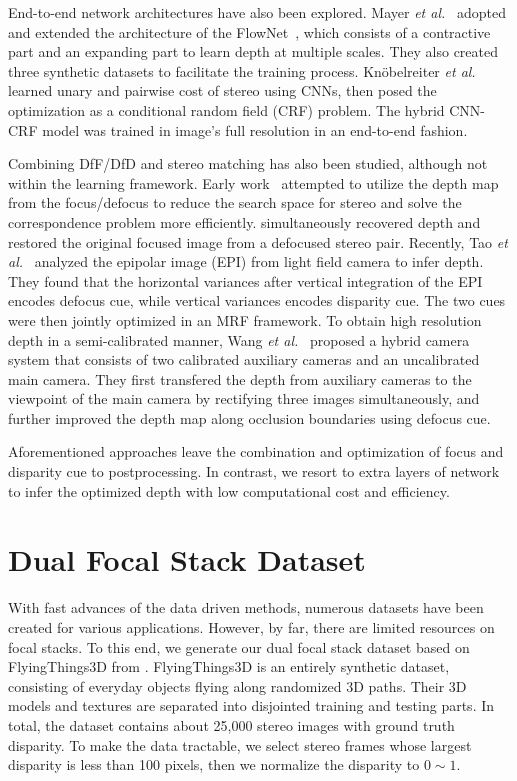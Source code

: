 \documentclass[10pt,twocolumn,letterpaper]{article}
\begin{document}
End-to-end network architectures have also been explored. Mayer \emph{et al.}~\cite{mayer16} adopted and extended the architecture of the FlowNet~\cite{dosovitskiy2015flownet}, which consists of a contractive part and an expanding part to learn depth at multiple scales. They also created three synthetic datasets to facilitate the training process. Kn{\"o}belreiter \emph{et al.}~\cite{knobelreiter2016end} learned unary and pairwise cost of stereo using CNNs, then posed the optimization as a conditional random field (CRF) problem. The hybrid CNN-CRF model was trained in image's full resolution in an end-to-end fashion.

Combining DfF/DfD and stereo matching has also been studied, although not within the learning framework. Early work~\cite{klarquist95, subbarao97} attempted to utilize the depth map from the focus/defocus to reduce the search space for stereo and solve the correspondence problem more efficiently. \cite{Rajagopalan04} simultaneously recovered depth and restored the original focused image from a defocused stereo pair. Recently, Tao \emph{et al.}~\cite{tao13} analyzed the epipolar image (EPI) from light field camera to infer depth. They found that the horizontal variances after vertical integration of the EPI encodes defocus cue, while vertical variances encodes disparity cue. The two cues were then jointly optimized in an MRF framework. To obtain high resolution depth in a semi-calibrated manner, Wang \emph{et al.}~\cite{wang16} proposed a hybrid camera system that consists of two calibrated auxiliary cameras and an uncalibrated main camera. They first transfered the depth from auxiliary cameras to the viewpoint of the main camera by rectifying three images simultaneously, and further improved the depth map along occlusion boundaries using defocus cue.

Aforementioned approaches leave the combination and optimization of focus and disparity cue to postprocessing. In contrast, we resort to extra layers of network to infer the optimized depth with low computational cost and efficiency.




\section{Dual Focal Stack Dataset}
With fast advances of the data driven methods, numerous datasets have been created for various applications. However, by far, there are limited resources on focal stacks. To this end, we generate our dual focal stack dataset based on FlyingThings3D from \cite{mayer16}. FlyingThings3D is an entirely synthetic dataset, consisting of everyday objects flying along randomized 3D paths. Their 3D models and textures are separated into disjointed training and testing parts. In total, the dataset contains about 25,000 stereo images with ground truth disparity. To make the data tractable, we select stereo frames whose largest disparity is less than 100 pixels, then we normalize the disparity to $0\sim1$.
\end{document}
